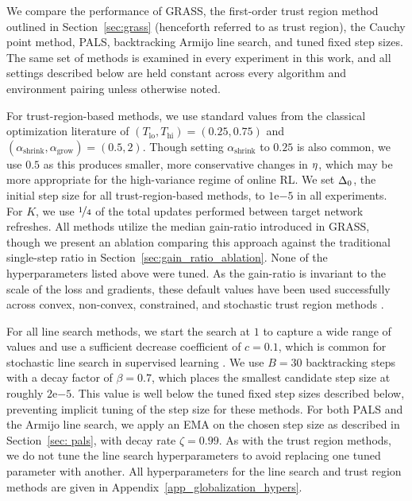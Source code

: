 We compare the performance of GRASS, the first-order trust region method outlined in Section~\ref{sec:grass} (henceforth referred to as trust region), the Cauchy point method, PALS, backtracking Armijo line search, and tuned fixed step sizes. The same set of methods is examined in every experiment in this work, and all settings described below are held constant across every algorithm and environment pairing unless otherwise noted.

For trust-region-based methods, we use standard values from the classical optimization literature \cite{nocedal2006numerical}  of $(T_{\text{lo}}, T_{\text{hi}}) = (0.25, 0.75)$ and $(\alpha_{\text{shrink}}, \alpha_{\text{grow}}) = (0.5, 2)$. Though setting $\alpha_{\text{shrink}}$ to $0.25$ is also common, we use $0.5$ as this produces smaller, more conservative changes in $\eta$, which may be more appropriate for the high-variance regime of online RL. We set $\Delta_0$, the initial step size for all trust-region-based methods, to $1\mathrm{e}{-5}$ in all experiments. For $K$, we use $\nicefrac{1}{4}$ of the total updates performed between target network refreshes. All methods utilize the median gain-ratio introduced in GRASS, though we present an ablation comparing this approach against the traditional single-step ratio in Section~\ref{sec:gain_ratio_ablation}. None of the hyperparameters listed above were tuned. As the gain-ratio is invariant to the scale of the loss and gradients, these default values have been used successfully across convex, non-convex, constrained, and stochastic trust region methods \cite{nocedal2006numerical} . 

For all line search methods, we start the search at $1$ to capture a wide range of values and use a sufficient decrease coefficient of $c=0.1$, which is common for stochastic line search in supervised learning \cite{vaswani2019painless}. We use $B=30$ backtracking steps with a decay factor of $\beta=0.7$, which places the smallest candidate step size at roughly $2\mathrm{e}{-5}$. This value is well below the tuned fixed step sizes described below, preventing implicit tuning of the step size for these methods. For both PALS and the Armijo line search, we apply an EMA on the chosen step size as described in Section~\ref{sec: pals}, with decay rate $\zeta = 0.99$. As with the trust region methods, we do not tune the line search hyperparameters to avoid replacing one tuned parameter with another. All hyperparameters for the line search and trust region methods are given in Appendix~\ref{app_globalization_hypers}.

